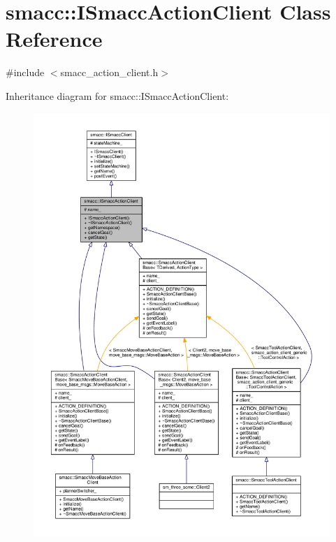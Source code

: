 \hypertarget{classsmacc_1_1ISmaccActionClient}{}\section{smacc\+:\+:I\+Smacc\+Action\+Client Class Reference}
\label{classsmacc_1_1ISmaccActionClient}


{\ttfamily \#include $<$smacc\+\_\+action\+\_\+client.\+h$>$}



Inheritance diagram for smacc\+:\+:I\+Smacc\+Action\+Client\+:
\nopagebreak
\begin{figure}[H]
\begin{center}
\leavevmode
\includegraphics[width=350pt]{classsmacc_1_1ISmaccActionClient__inherit__graph}
\end{center}
\end{figure}


